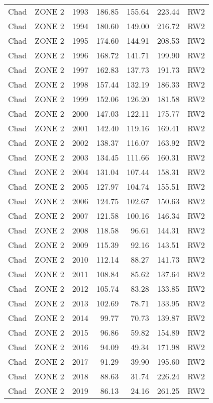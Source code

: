 \begin{longtable}{lllrrrl}
  Chad & ZONE 2 & 1993 & 186.85 & 155.64 & 223.44 & RW2 \\ 
  Chad & ZONE 2 & 1994 & 180.60 & 149.00 & 216.72 & RW2 \\ 
  Chad & ZONE 2 & 1995 & 174.60 & 144.91 & 208.53 & RW2 \\ 
  Chad & ZONE 2 & 1996 & 168.72 & 141.71 & 199.90 & RW2 \\ 
  Chad & ZONE 2 & 1997 & 162.83 & 137.73 & 191.73 & RW2 \\ 
  Chad & ZONE 2 & 1998 & 157.44 & 132.19 & 186.33 & RW2 \\ 
  Chad & ZONE 2 & 1999 & 152.06 & 126.20 & 181.58 & RW2 \\ 
  Chad & ZONE 2 & 2000 & 147.03 & 122.11 & 175.77 & RW2 \\ 
  Chad & ZONE 2 & 2001 & 142.40 & 119.16 & 169.41 & RW2 \\ 
  Chad & ZONE 2 & 2002 & 138.37 & 116.07 & 163.92 & RW2 \\ 
  Chad & ZONE 2 & 2003 & 134.45 & 111.66 & 160.31 & RW2 \\ 
  Chad & ZONE 2 & 2004 & 131.04 & 107.44 & 158.31 & RW2 \\ 
  Chad & ZONE 2 & 2005 & 127.97 & 104.74 & 155.51 & RW2 \\ 
  Chad & ZONE 2 & 2006 & 124.75 & 102.67 & 150.63 & RW2 \\ 
  Chad & ZONE 2 & 2007 & 121.58 & 100.16 & 146.34 & RW2 \\ 
  Chad & ZONE 2 & 2008 & 118.58 & 96.61 & 144.31 & RW2 \\ 
  Chad & ZONE 2 & 2009 & 115.39 & 92.16 & 143.51 & RW2 \\ 
  Chad & ZONE 2 & 2010 & 112.14 & 88.27 & 141.73 & RW2 \\ 
  Chad & ZONE 2 & 2011 & 108.84 & 85.62 & 137.64 & RW2 \\ 
  Chad & ZONE 2 & 2012 & 105.74 & 83.28 & 133.85 & RW2 \\ 
  Chad & ZONE 2 & 2013 & 102.69 & 78.71 & 133.95 & RW2 \\ 
  Chad & ZONE 2 & 2014 & 99.77 & 70.73 & 139.87 & RW2 \\ 
  Chad & ZONE 2 & 2015 & 96.86 & 59.82 & 154.89 & RW2 \\ 
  Chad & ZONE 2 & 2016 & 94.09 & 49.34 & 171.98 & RW2 \\ 
  Chad & ZONE 2 & 2017 & 91.29 & 39.90 & 195.60 & RW2 \\ 
  Chad & ZONE 2 & 2018 & 88.63 & 31.74 & 226.24 & RW2 \\ 
  Chad & ZONE 2 & 2019 & 86.13 & 24.16 & 261.25 & RW2 \\ 

\end{longtable}

